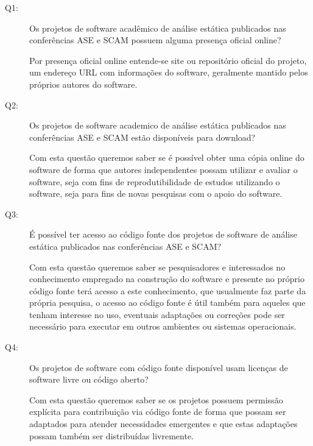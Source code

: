 \newcommand{\EstudoUmQuestaoUm}{
  Os projetos de software acadêmico de análise estática publicados nas
  conferências ASE e SCAM possuem alguma presença oficial online?
}
\newcommand{\EstudoUmQuestaoDois}{
  Os projetos de software academico de análise estática publicados nas
  conferências ASE e SCAM estão disponíveis para download?
}
\newcommand{\EstudoUmQuestaoTres}{
  É possível ter acesso ao código fonte dos projetos de software de análise
  estática publicados nas conferências ASE e SCAM?
}
\newcommand{\EstudoUmQuestaoQuatro}{
  Os projetos de software com código fonte disponível usam licenças de software
  livre ou código aberto?
}

\begin{description}
  \item [Q1:] \EstudoUmQuestaoUm

    Por presença oficial online entende-se site ou repositório oficial do
    projeto, um endereço URL com informações do software, geralmente mantido
    pelos próprios autores do software.

  \item [Q2:] \EstudoUmQuestaoDois

    Com esta questão queremos saber se é possível obter uma cópia online do
    software de forma que autores independentes possam utilizar e avaliar
    o software, seja com fins de reprodutibilidade de estudos utilizando o
    software, seja para fins de novas pesquisas com o apoio do software.

  \item [Q3:] \EstudoUmQuestaoTres

    Com esta questão queremos saber se pesquisadores e interessados no conhecimento
    empregado na construção do software e presente no próprio código fonte terá acesso
    a este conhecimento, que usualmente faz parte da própria pesquisa, o acesso
    ao código fonte é útil também para aqueles que tenham interesse no uso, eventuais
    adaptações ou correções pode ser necessário para executar em outros ambientes
    ou sistemas operacionais.

  \item [Q4:] \EstudoUmQuestaoQuatro

    Com esta questão queremos saber se os projetos possuem permissão explícita
    para contribuição via código fonte de forma que possam ser adaptados para
    atender necessidades emergentes e que estas adaptações possam também ser
    distribuídas livremente.
\end{description}

